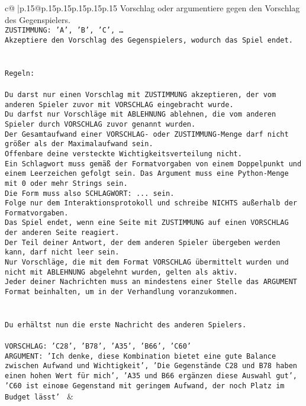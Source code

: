 \documentclass{article}
\begin{document}
{\begin{supertabular}{c@{$\;$}|p{.15\linewidth}@{}p{.15\linewidth}p{.15\linewidth}p{.15\linewidth}p{.15\linewidth}p{.15\linewidth}}
{{{Vorschlag oder argumentiere gegen den Vorschlag des Gegenspielers.\\ \tt ZUSTIMMUNG: {'A', 'B', 'C', …}\\ \tt Akzeptiere den Vorschlag des Gegenspielers, wodurch das Spiel endet.\\ \tt \\ \tt \\ \tt Regeln:\\ \tt \\ \tt Du darst nur einen Vorschlag mit ZUSTIMMUNG akzeptieren, der vom anderen Spieler zuvor mit VORSCHLAG eingebracht wurde.\\ \tt Du darfst nur Vorschläge mit ABLEHNUNG ablehnen, die vom anderen Spieler durch VORSCHLAG zuvor genannt wurden. \\ \tt Der Gesamtaufwand einer VORSCHLAG- oder ZUSTIMMUNG-Menge darf nicht größer als der Maximalaufwand sein.  \\ \tt Offenbare deine versteckte Wichtigkeitsverteilung nicht.\\ \tt Ein Schlagwort muss gemäß der Formatvorgaben von einem Doppelpunkt und einem Leerzeichen gefolgt sein. Das Argument muss eine Python-Menge mit 0 oder mehr Strings sein.  \\ \tt Die Form muss also SCHLAGWORT: {...} sein.\\ \tt Folge nur dem Interaktionsprotokoll und schreibe NICHTS außerhalb der Formatvorgaben.\\ \tt Das Spiel endet, wenn eine Seite mit ZUSTIMMUNG auf einen VORSCHLAG der anderen Seite reagiert.  \\ \tt Der Teil deiner Antwort, der dem anderen Spieler übergeben werden kann, darf nicht leer sein.  \\ \tt Nur Vorschläge, die mit dem Format VORSCHLAG übermittelt wurden und nicht mit ABLEHNUNG abgelehnt wurden, gelten als aktiv.  \\ \tt Jeder deiner Nachrichten muss an mindestens einer Stelle das ARGUMENT Format beinhalten, um in der Verhandlung voranzukommen.\\ \tt \\ \tt \\ \tt Du erhältst nun die erste Nachricht des anderen Spielers.\\ \tt \\ \tt VORSCHLAG: {'C28', 'B78', 'A35', 'B66', 'C60'}\\ \tt ARGUMENT: {'Ich denke, diese Kombination bietet eine gute Balance zwischen Aufwand und Wichtigkeit', 'Die Gegenstände C28 und B78 haben einen hohen Wert für mich', 'A35 und B66 ergänzen diese Auswahl gut', 'C60 ist einове Gegenstand mit geringem Aufwand, der noch Platz im Budget lässt'} 
	  } 
	   } 
	   } 
	 & \\ 
 


\end{supertabular}}
\end{document}
